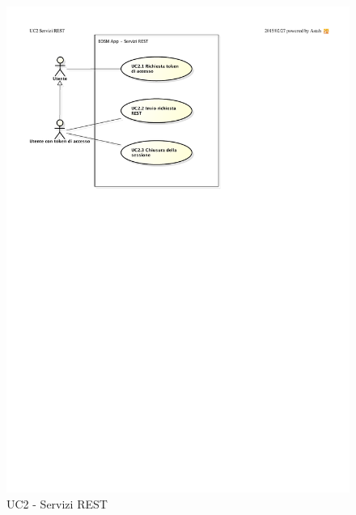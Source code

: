 \begin{figure}[htbp]
	\centering
	\centerline{\includegraphics{./images/UC2.pdf}} %
	\caption{UC2 - Servizi REST}
\end{figure}

